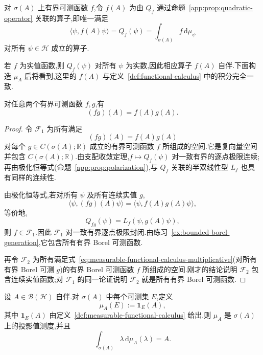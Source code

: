 \begin{definition}[可测函数演算]\label{def:measurable-functional-calculus}
对 \(\sigma(A)\) 上有界可测函数 \(f\),令 \(f(A)\) 为由 \(Q_{f}\) 通过命题~\ref{app:prop:quadratic-operator} 关联的算子,即唯一满足
\[
\langle\psi,f(A)\psi\rangle=Q_{f}(\psi)
=\int_{\sigma(A)}f\,\mathrm{d}\mu_{\psi}
\]
对所有 \(\psi\in\mathcal{H}\) 成立的算子.
\end{definition}

若 \(f\) 为实值函数,则 \(Q_{f}(\psi)\) 对所有 \(\psi\) 为实数,因此相应算子 \(f(A)\) 自伴.下面构造 \(\mu_{A}\) 后将看到,这里的 \(f(A)\) 与定义~\ref{def:functional-calculus} 中的积分完全一致.

\begin{proposition}[可测函数演算的乘法性]\label{prop:measurable-functional-calculus-multiplicative}
对任意两个有界可测函数 \(f,g\),有
\[
(fg)(A)=f(A)g(A).
\label{eq:measurable-functional-calculus-multiplicative}
\]
\end{proposition}

\begin{proof}
令 \(\mathcal{F}_{1}\) 为所有满足
\[
(fg)(A)=f(A)g(A)
\]
对每个 \(g\in C(\sigma(A);\mathbb{R})\) 成立的有界可测函数 \(f\) 所组成的空间.它是复向量空间并包含 \(C(\sigma(A);\mathbb{R})\).由支配收敛定理,\(f\mapsto Q_{f}(\psi)\) 对一致有界的逐点极限连续;再由极化恒等式(命题~\ref{app:prop:polarization}),与 \(Q_{f}\) 关联的半双线性型 \(L_{f}\) 也具有同样的连续性.

由极化恒等式,若对所有 \(\psi\) 及所有连续实值 \(g\),
\[
\langle\psi,(fg)(A)\psi\rangle
=\langle\psi,f(A)g(A)\psi\rangle,
\]
等价地,
\[
Q_{fg}(\psi)=L_{f}(\psi,g(A)\psi),
\]
则 \(f\in\mathcal{F}_{1}\).因此 \(\mathcal{F}_{1}\) 对一致有界逐点极限封闭.由练习~\ref{ex:bounded-borel-generation},它包含所有有界 Borel 可测函数.

再令 \(\mathcal{F}_{2}\) 为所有满足式~\eqref{eq:measurable-functional-calculus-multiplicative}(对所有有界 Borel 可测 \(g\))的有界 Borel 可测函数 \(f\) 所组成的空间.刚才的结论说明 \(\mathcal{F}_{2}\) 包含连续实值函数;对 \(\mathcal{F}_{1}\) 的同一论证说明 \(\mathcal{F}_{2}\) 就是所有有界 Borel 可测函数.
\end{proof}

\begin{theorem}[投影值测度的构造]\label{thm:construct-pvm}
设 \(A\in\mathcal{B}(\mathcal{H})\) 自伴.对 \(\sigma(A)\) 中每个可测集 \(E\),定义
\[
\mu_{A}(E):=\mathbf{1}_{E}(A),
\]
其中 \(\mathbf{1}_{E}(A)\) 由定义~\ref{def:measurable-functional-calculus} 给出.则 \(\mu_{A}\) 是 \(\sigma(A)\) 上的投影值测度,并且
\[
\int_{\sigma(A)}\lambda\,\mathrm{d}\mu_{A}(\lambda)=A.
\label{eq:construct-pvm-integral}
\]
\end{theorem}


